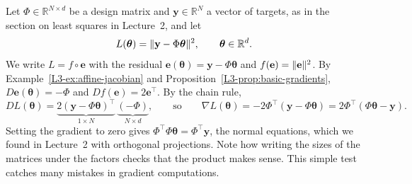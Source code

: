\begin{example}\label{L3-ex:ls-gradient}
    Let $\Phi \in \mathbb{R}^{N \times d}$ be a design matrix and $\mathbf{y} \in \mathbb{R}^N$ a vector of targets, as in the section on least squares in Lecture~2, and let
    \[L(\boldsymbol{\theta}) = \lVert \mathbf{y} - \Phi\boldsymbol{\theta} \rVert^2, \qquad \boldsymbol{\theta} \in \mathbb{R}^d.\]
    We write $L = f \circ \mathbf{e}$ with the residual $\mathbf{e}(\boldsymbol{\theta}) = \mathbf{y} - \Phi\boldsymbol{\theta}$ and $f(\mathbf{e}) = \lVert \mathbf{e} \rVert^2$. By Example~\ref{L3-ex:affine-jacobian} and Proposition~\ref{L3-prop:basic-gradients}, $D\mathbf{e}(\boldsymbol{\theta}) = -\Phi$ and $Df(\mathbf{e}) = 2\mathbf{e}^\top$. By the chain rule,
    \[DL(\boldsymbol{\theta}) = \underbrace{2(\mathbf{y} - \Phi\boldsymbol{\theta})^\top}_{1 \times N} \, \underbrace{(-\Phi)}_{N \times d}, \qquad \text{so} \qquad \nabla L(\boldsymbol{\theta}) = -2\Phi^\top(\mathbf{y} - \Phi\boldsymbol{\theta}) = 2\Phi^\top(\Phi\boldsymbol{\theta} - \mathbf{y}).\]
    Setting the gradient to zero gives $\Phi^\top\Phi\boldsymbol{\theta} = \Phi^\top\mathbf{y}$, the normal equations, which we found in Lecture~2 with orthogonal projections. Note how writing the sizes of the matrices under the factors checks that the product makes sense. This simple test catches many mistakes in gradient computations.
\end{example}

